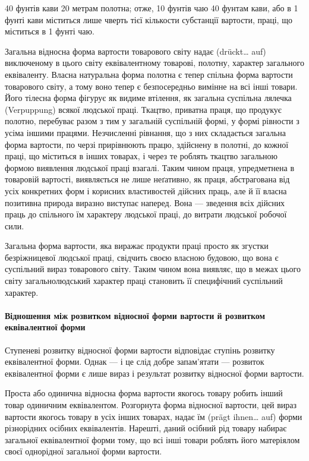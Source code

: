 \parcont{}  %
40 фунтів кави \deq{} 20 метрам полотна; отже, 10 фунтів чаю \deq{}
40 фунтам кави, або в 1 фунті кави міститься лише чверть тієї
кількости субстанції вартости, праці, що міститься в 1 фунті чаю.

Загальна відносна форма вартости товарового світу надає
(drückt\dots{} auf) виключеному в цього світу еквівалентному товарові,
полотну, характер загального еквіваленту. Власна натуральна
форма полотна є тепер спільна форма вартости товарового
світу, а тому воно тепер є безпосередньо вимінне на всі інші товари.
Його тілесна форма фігурує як видиме втілення, як загальна
суспільна лялечка (Verpuppung) всякої людської праці. Ткацтво,
приватна праця, що продукує полотно, перебуває разом з тим у
загальній суспільній формі, у формі рівности з усіма іншими
працями. Незчисленні рівнання, що з них складається загальна
форма вартости, по черзі прирівнюють працю, здійснену в полотні,
до кожної праці, що міститься в інших товарах, і через те роблять
ткацтво загальною формою виявлення людської праці взагалі.
Таким чином праця, упредметнена в товаровій вартості, виявляється
не лише неґативно, як праця, абстрагована від усіх конкретних
форм і корисних властивостей дійсних праць, але й її
власна позитивна природа виразно виступає наперед. Вона —
зведення всіх дійсних праць до спільного їм характеру людської
праці, до витрати людської робочої сили.

Загальна форма вартости, яка виражає продукти праці просто
як згустки безріжницевої людської праці, свідчить своєю власною
будовою, що вона є суспільний вираз товарового світу. Таким
чином вона виявляє, що в межах цього світу загальнолюдський
характер праці становить її специфічний суспільний характер.

\paragraph{Відношення між розвитком відносної форми вартости й розвитком
еквівалентної форми}

Ступеневі розвитку відносної форми вартости відповідає ступінь
розвитку еквівалентної форми. Однак — і це слід добре запам’ятати
— розвиток еквівалентної форми є лише вираз і результат
розвитку відносної форми вартости.

Проста або одинична відносна форма вартости якогось товару
робить інший товар одиничним еквівалентом. Розгорнута форма
відносної вартости, цей вираз вартости якогось товару в усіх
інших товарах, надає їм (prägt ihnen\dots{} auf) форми різнорідних
осібних еквівалентів. Нарешті, даний осібний рід товару набирає
загальної еквівалентної форми тому, що всі інші товари роблять
його матеріялом своєї однорідної загальної форми вартости.

